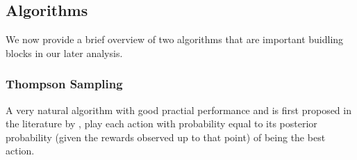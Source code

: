 \subsection{Algorithms}

We now provide a brief overview of two algorithms that are important buidling blocks in our later analysis. 

\subsubsection{Thompson Sampling}

 A very natural algorithm with good practial performance and is first proposed in the literature by \cite{thompson:33}, play each action with probability equal to its posterior probability (given the rewards observed up to that point) of being the best action.








